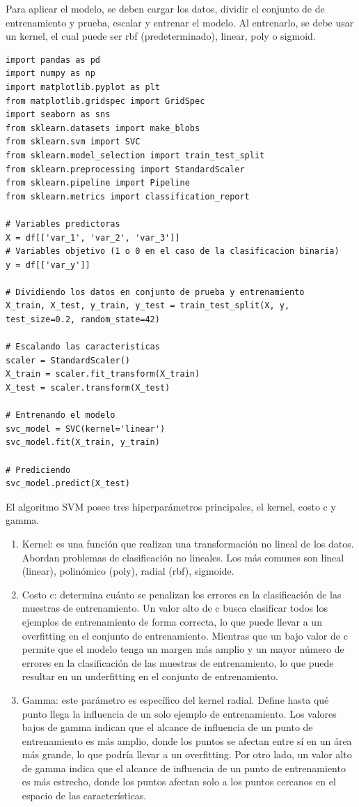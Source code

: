 \documentclass[a4paper, 12pt]{book}
\begin{document}
Para aplicar el modelo, se deben cargar los datos, dividir el conjunto de de entrenamiento y prueba, escalar y entrenar el modelo. Al entrenarlo, se debe usar un kernel, el cual puede ser rbf (predeterminado), linear, poly o sigmoid.
\begin{verbatim}
import pandas as pd
import numpy as np
import matplotlib.pyplot as plt
from matplotlib.gridspec import GridSpec
import seaborn as sns
from sklearn.datasets import make_blobs
from sklearn.svm import SVC
from sklearn.model_selection import train_test_split
from sklearn.preprocessing import StandardScaler
from sklearn.pipeline import Pipeline
from sklearn.metrics import classification_report

# Variables predictoras
X = df[['var_1', 'var_2', 'var_3']]
# Variables objetivo (1 o 0 en el caso de la clasificacion binaria)
y = df[['var_y']]

# Dividiendo los datos en conjunto de prueba y entrenamiento
X_train, X_test, y_train, y_test = train_test_split(X, y, test_size=0.2, random_state=42)

# Escalando las caracteristicas
scaler = StandardScaler()
X_train = scaler.fit_transform(X_train)
X_test = scaler.transform(X_test)

# Entrenando el modelo
svc_model = SVC(kernel='linear')
svc_model.fit(X_train, y_train)

# Prediciendo
svc_model.predict(X_test)

\end{verbatim}

El algoritmo SVM posee tres hiperparámetros principales, el kernel, costo c y gamma.
\begin{enumerate}
	\item Kernel: es una función que realizan una transformación no lineal de los datos. Abordan problemas de clasificación no lineales. Los más comunes son lineal (linear), polinómico (poly), radial (rbf), sigmoide.
	\item Costo c: determina cuánto se penalizan los errores en la clasificación de las muestras de entrenamiento. Un valor alto de c busca clasificar todos los ejemplos de entrenamiento de forma correcta, lo que puede llevar a un overfitting en el conjunto de entrenamiento. Mientras que un bajo valor de c permite que el modelo tenga un margen más amplio y un mayor número de errores en la clasificación de las muestras de entrenamiento, lo que puede resultar en un underfitting en el conjunto de entrenamiento.
	\item Gamma: este parámetro es específico del kernel radial. Define hasta qué punto llega la influencia de un solo ejemplo de entrenamiento. Los valores bajos de gamma indican que el alcance de influencia de un punto de entrenamiento es más amplio, donde los puntos se afectan entre sí en un área más grande, lo que podría llevar a un overfitting. Por otro lado, un valor alto de gamma indica que el alcance de influencia de un punto de entrenamiento es más estrecho, donde los puntos afectan solo a los puntos cercanos en el espacio de las características.
\end{enumerate}
\end{document}

